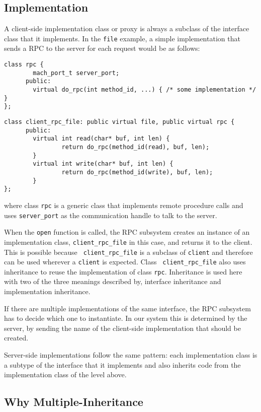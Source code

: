 \subsection{Implementation}

A client-side implementation class or proxy is always a subclass of
the interface class that it
implements. In the {\tt file} example, a simple implementation that
sends a RPC to the server for each request would be as follows:

{\small 
\begin{verbatim}
class rpc {
        mach_port_t server_port;
      public:
        virtual do_rpc(int method_id, ...) { /* some implementation */ }
};
\end{verbatim}
}
{\small 
\begin{verbatim}
class client_rpc_file: public virtual file, public virtual rpc {
      public:
        virtual int read(char* buf, int len) { 
                return do_rpc(method_id(read), buf, len);
        }
        virtual int write(char* buf, int len) {
                return do_rpc(method_id(write), buf, len);
        }
};
\end{verbatim}
}

\noindent 
where class {\tt rpc} is a generic class that implements remote
procedure calls and uses {\tt server\_port} as the communication
handle to talk to the server.

When the {\tt open} function is called, the RPC subsystem creates an
instance of an implementation class, {\tt client\_rpc\_file} in this
case, and returns it to the client. This is possible because {\tt
client\_rpc\_file} is a subclass of {\tt client} and therefore can be
used wherever a {\tt client} is expected. Class {\tt
client\_rpc\_file} also 
uses inheritance to reuse the implementation of class {\tt rpc}.
Inheritance is used here with two of the three meanings described
by\cite{waldo}, interface inheritance and implementation inheritance.

If there are multiple implementations of the same interface, the RPC
subsystem has to decide which one to instantiate. In our system this
is determined by the server, by sending the name of the client-side
implementation that should be created.

Server-side implementations follow the same pattern: each
implementation class is a subtype of the interface that it implements and
also inherits code from the implementation class of the level above.

\subsection{Why Multiple-Inheritance}

